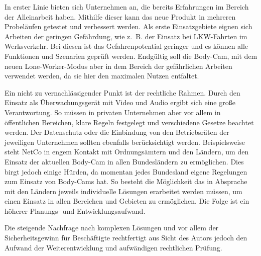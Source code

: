 \documentclass[thesis.tex]{subfiles}
\begin{document}
In erster Linie bieten sich Unternehmen an, die bereits Erfahrungen im Bereich der Alleinarbeit haben.
Mithilfe dieser kann das neue Produkt in mehreren Probeläufen getestet und verbessert werden.
Als erste Einsatzgebiete eignen sich Arbeiten der geringen Gefährdung, wie z.~B. der Einsatz bei LKW-Fahrten im Werksverkehr.
Bei diesen ist das Gefahrenpotential geringer und es können alle Funktionen und Szenarien geprüft werden.
Endgültig soll die Body-Cam, mit dem neuen Lone-Worker-Modus aber in dem Bereich der gefährlichen Arbeiten verwendet werden, da sie hier den maximalen Nutzen entfaltet.

Ein nicht zu vernachlässigender Punkt ist der rechtliche Rahmen.
Durch den Einsatz als Überwachungsgerät mit Video und Audio ergibt sich eine große Verantwortung.
So müssen in privaten Unternehmen aber vor allem in öffentlichen Bereichen, klare Regeln festgelegt und verschiedene Gesetze beachtet werden.
Der Datenschutz oder die Einbindung von den Betriebsräten der jeweiligen Unternehmen sollten ebenfalls berücksichtigt werden.
Beispielsweise steht NetCo in engem Kontakt mit Ordnungsämtern und den Ländern, um den Einsatz der aktuellen Body-Cam in allen Bundesländern zu ermöglichen.
Dies birgt jedoch einige Hürden, da momentan jedes Bundesland eigene Regelungen zum Einsatz von Body-Cams hat.
So besteht die Möglichkeit das in Absprache mit den Ländern jeweils individuelle Lösungen erarbeitet werden müssen, um einen Einsatz in allen Bereichen und Gebieten zu ermöglichen.
Die Folge ist ein höherer Planungs- und Entwicklungsaufwand.

Die steigende Nachfrage nach komplexen Lösungen und vor allem der Sicherheitsgewinn für Beschäftigte rechtfertigt aus Sicht des Autors jedoch den Aufwand der Weiterentwicklung und aufwändigen rechtlichen Prüfung.

\subfilebib %
\end{document}
